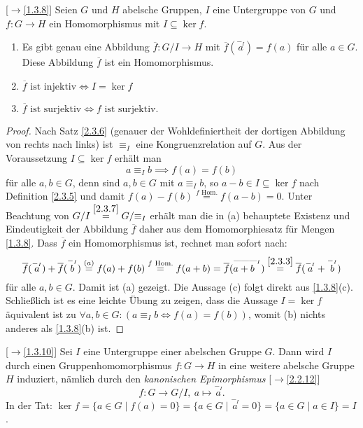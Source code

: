 \documentclass[../../main.tex]{subfiles}
\begin{document}

\begin{sat}\label{2.3.11}{\rm[$\to$\ref{1.3.8}]}
Seien $G$ und $H$ abelsche Gruppen, $I$ eine Untergruppe von $G$ und $f\colon G\to H$ ein Homomorphismus
mit $I\subseteq\ker f$.
\begin{enumerate}[\rm(a)]
\item
Es gibt genau eine Abbildung $\overline f\colon G/I\to H$ mit
$\overline f(\overset{-_I}a)=f(a)$ für alle $a\in G$. Diese Abbildung $\overline f$ ist ein Homomorphismus.
\item
$\text{$\overline f$ ist injektiv}\iff I=\ker f$
\item
$\text{$\overline f$ ist surjektiv}\iff\text{$f$ ist surjektiv.}$
\end{enumerate}
\end{sat}
\begin{proof}
Nach Satz \ref{2.3.6} (genauer der Wohldefiniertheit der dortigen Abbildung von rechts nach links) ist $\equiv_I$ eine Kongruenzrelation auf $G$. Aus der Voraussetzung
$I\subseteq\ker f$ erhält man
$$a\equiv_Ib\implies f(a)=f(b)$$
für alle $a,b\in G$, denn sind $a,b\in G$ mit $a\equiv_Ib$, so  $a-b\in I\subseteq\ker f$ nach Definition \ref{2.3.5} und damit
$f(a)-f(b)\overset{\text{$f$ Hom.}}=f(a-b)=0$. Unter Beachtung von $G/I\overset{\ref{2.3.7}}=G/\mbox{$\equiv_I$}$ erhält man die in (a) behauptete
Existenz und Eindeutigkeit der Abbildung $\overline f$ daher aus dem Homomorphiesatz für Mengen \ref{1.3.8}. Dass $\overline f$ ein Homomorphismus ist, rechnet man sofort nach:
$$\overline f(\overset{-_I}a)+\overline f(\overset{-_I}b)\overset{(a)}=f(a)+f(b)\overset{\text{$f$ Hom.}}=f(a+b)=\overline f(\overset{\text{---------}_I}{a+b~~})\overset{\ref{2.3.3}}=
\overline f(\overset{-_I}a+\overset{-_I}b)$$
für alle $a,b\in G$. Damit ist (a) gezeigt. Die Aussage (c) folgt direkt aus \ref{1.3.8}(c). Schließlich ist es eine leichte Übung zu zeigen, dass die Aussage $I=\ker f$ äquivalent ist zu
$\forall a,b\in G:(a\equiv_Ib\iff f(a)=f(b))$, womit (b) nichts anderes als \ref{1.3.8}(b) ist.
\end{proof}

\begin{bem}{\rm[$\to$\ref{1.3.10}]}\label{2.3.12}
Sei $I$ eine Untergruppe einer abelschen Gruppe $G$. Dann wird $I$ durch einen Gruppenhomomorphismus
$f\colon G\to H$ in eine weitere abelsche Gruppe $H$ induziert, nämlich durch den \emph{kanonischen Epimorphismus} [$\to$\ref{2.2.12}]
$$f\colon G\to G/I,\ a\mapsto\overset{-_I}a.$$
In der Tat: $\ker f=\{a\in G\mid f(a)=0\}=\{a\in G\mid \overset{-_I}a=0\}=\{a\in G\mid a\in I\}=I$.
\end{bem}
\end{document}

